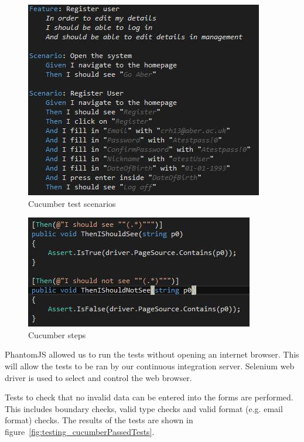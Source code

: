 \begin{figure}[H]
\begin{center}
\includegraphics[scale=0.6]{images/testing/cucumberScenarios.jpg} 
\caption{Cucumber test scenarios}
\label{fig:testing_cucumberScenarios}
\end{center}
\end{figure}

\begin{figure}[H]
\begin{center}
\includegraphics[scale=0.6]{images/testing/cucumberCodeSteps.jpg} 
\caption{Cucumber steps}
\label{fig:testing_cucumberCodeSteps}
\end{center}
\end{figure}

PhantomJS \cite{PhantomJS} allowed us to run the tests without opening an internet browser. This will allow the tests to be ran by our continuous integration server. Selenium web driver is used to select and control the web browser.

Tests to check that no invalid data can be entered into the forms are performed. This includes boundary checks, valid type checks and valid format (e.g. email format) checks. The results of the tests are shown in figure~\ref{fig:testing_cucumberPassedTests}.

